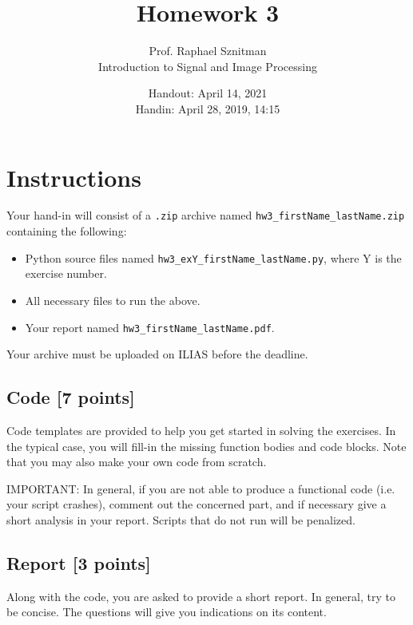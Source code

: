 \documentclass[12pt]{article}
\begin{document}


\title{Homework 3}%
\author{Prof. Raphael Sznitman\\ %
Introduction to Signal and Image Processing} %
\date{Handout: April 14, 2021\\
	Handin: April 28, 2019, 14:15}

\maketitle

\section*{Instructions}

Your hand-in will consist of a \texttt{.zip} archive named \verb|hw3_firstName_lastName.zip| containing the following:

\begin{itemize}
  \item Python source files named \verb|hw3_exY_firstName_lastName.py|, where Y is the exercise number.
  \item All necessary files to run the above.
  \item Your report named \verb|hw3_firstName_lastName.pdf|.
\end{itemize}

Your archive must be uploaded on ILIAS before the deadline. 

\subsection*{Code [7 points]}
Code templates are provided to help you get started in solving the exercises.
In the typical case, you will fill-in the missing function bodies and code blocks.
Note that you may also make your own code from scratch.

IMPORTANT: In general, if you are not able to produce a functional code (i.e. your script crashes), comment out the concerned part, and if necessary give a short analysis in your report.
Scripts that do not run will be penalized.

\subsection*{Report [3 points]}
Along with the code, you are asked to provide a short report. In general, try to be concise.
The questions will give you indications on its content.
\end{document}
